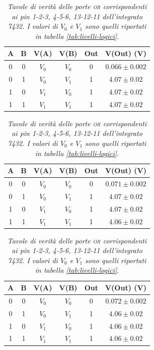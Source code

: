 \begin{table}[H]
  \centering
\begin{subtable}[H]{0.5\textwidth}
    \centering
    \begin{tabular}[t]{c  c | c  c | c  c}
      \hline
      A & B & V(A) & V(B) & Out & V(Out) (V)\\
      \hline
    0 & 0 & $V_{0}$ & $V_{0}$ & 0 & $0.066 \pm 0.002$ \\
    0 & 1 & $V_{0}$ & $V_{1}$ & 1 & $4.07  \pm 0.02$ \\
    1 & 0 & $V_{1}$ & $V_{0}$ & 1 & $4.07  \pm 0.02$ \\
    1 & 1 & $V_{1}$ & $V_{1}$ & 1 & $4.07 \pm 0.02$ \\
      \hline
    \end{tabular}
  \end{subtable}

  \vspace{.5cm}

  \begin{subtable}[H]{0.5\textwidth}
    \centering
    \begin{tabular}[t]{c  c | c  c | c  c}
      \hline
      A & B & V(A) & V(B) & Out & V(Out) (V)\\
      \hline
    0 & 0 & $V_{0}$ & $V_{0}$ & 0 & $0.071 \pm 0.002$ \\
    0 & 1 & $V_{0}$ & $V_{1}$ & 1 & $4.07  \pm 0.02$ \\
    1 & 0 & $V_{1}$ & $V_{0}$ & 1 & $4.07  \pm 0.02$ \\
    1 & 1 & $V_{1}$ & $V_{1}$ & 1 & $4.06 \pm 0.02$ \\
      \hline
    \end{tabular}
  \end{subtable}

  \vspace{.5mm}

  \begin{subtable}[H]{0.5\textwidth}
    \centering
    \begin{tabular}[t]{c  c | c  c | c  c}
      \hline
      A & B & V(A) & V(B) & Out & V(Out) (V)\\
      \hline
   0 & 0 & $V_{0}$ & $V_{0}$ & 0 & $0.072  \pm 0.002$ \\
    0 & 1 & $V_{0}$ & $V_{1}$ & 1 & $4.06  \pm 0.02$ \\
    1 & 0 & $V_{1}$ & $V_{0}$ & 1 & $4.06  \pm 0.02$ \\
    1 & 1 & $V_{1}$ & $V_{1}$ & 1 & $4.06 \pm 0.02$ \\
      \hline
    \end{tabular}
  \end{subtable}

  \caption{\emph{Tavole di verità delle porte \textsc{or} corrispondenti ai pin 1-2-3, 4-5-6, 13-12-11 dell'integrato 7432. I valori di $V_{0}$ e $V_{1}$ sono quelli riportati in tabella \ref{tab:livelli-logici}}.}
  \label{tab:or-multiplexer}
\end{table}




